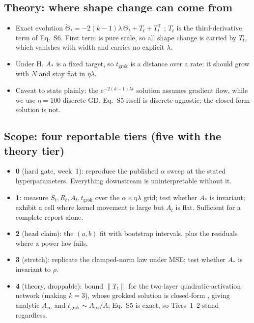 \documentclass[a4paper,11pt]{article} %
\newcommand{\tgrok}{t_{\mathrm{grok}}}
\newcommand{\Astar}{A_{*}}
\begin{document}
\subsection{Theory: where shape change can come from}
\begin{itemize}
	\item Exact evolution $\dot\Theta_t=-2(k-1)\lambda\,\Theta_t+T_t+T_t^\top$
		\citep[Eq.~S5]{lewkowycz2020l2}; $T_t$ is the third-derivative term of
		Eq.~S6. First term is pure scale, so all shape change is carried by $T_t$,
		which vanishes with width and carries no explicit $\lambda$.
	\item Under H, $\Astar$ is a fixed target, so $\tgrok$ is a distance over a
		rate: it should grow with $N$ and stay flat in $\eta\lambda$.
	\item Caveat to state plainly: the $e^{-2(k-1)\lambda t}$ solution assumes
		gradient flow, while we use $\eta=100$ discrete GD. Eq.~S5 itself is
		discrete-agnostic; the closed-form solution is not.
\end{itemize}

\subsection{Scope: four reportable tiers (five with the theory tier)}
\begin{itemize}
	\item \textbf{0} (hard gate, week~1): reproduce the published $\alpha$ sweep
		at the stated hyperparameters. Everything downstream is uninterpretable
		without it.
	\item \textbf{1}: measure $S_t,R_t,A_t,\tgrok$ over the $\alpha\times\eta\lambda$
		grid; test whether $\Astar$ is invariant; exhibit a cell where kernel
		movement is large but $A_t$ is flat. Sufficient for a complete report alone.
	\item \textbf{2} (head claim): the $(a,b)$ fit with bootstrap intervals, plus
		the residuals where a power law fails.
	\item \textbf{3} (stretch): replicate the clamped-norm law under MSE; test
		whether $\Astar$ is invariant to $\rho$.
	\item \textbf{4} (theory, droppable): bound $\lVert T_t\rVert$ for the
		two-layer quadratic-activation network (making $k=3$), whose grokked
		solution is closed-form \citep{gromov2023grokking}, giving analytic
		$A_\infty$ and $\tgrok\sim A_\infty/\dot A$; Eq.~S5 is exact, so Tiers~1--2
		stand regardless.
\end{itemize}
\end{document}

